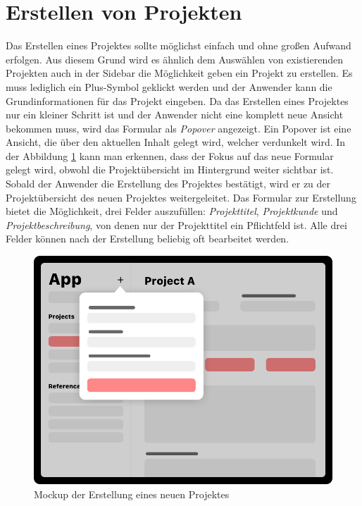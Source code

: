 \section{Erstellen von Projekten}
Das Erstellen eines Projektes sollte möglichst einfach und ohne großen Aufwand erfolgen.
Aus diesem Grund wird es ähnlich dem Auswählen von existierenden Projekten auch in der Sidebar die Möglichkeit geben ein Projekt zu erstellen.
Es muss lediglich ein Plus-Symbol geklickt werden und der Anwender kann die Grundinformationen für das Projekt eingeben.
Da das Erstellen eines Projektes nur ein kleiner Schritt ist und der Anwender nicht eine komplett neue Ansicht bekommen muss, wird das Formular als \emph{Popover} angezeigt.
Ein Popover ist eine Ansicht, die über den aktuellen Inhalt gelegt wird, welcher verdunkelt wird.
In der Abbildung \ref{fig:design-project-create} kann man erkennen, dass der Fokus auf das neue Formular gelegt wird, obwohl die Projektübersicht im Hintergrund weiter sichtbar ist.
Sobald der Anwender die Erstellung des Projektes bestätigt, wird er zu der Projektübersicht des neuen Projektes weitergeleitet.
Das Formular zur Erstellung bietet die Möglichkeit, drei Felder auszufüllen:
\emph{Projekttitel}, \emph{Projektkunde} und \emph{Projektbeschreibung}, von denen nur der Projekttitel ein Pflichtfeld ist.
Alle drei Felder können nach der Erstellung beliebig oft bearbeitet werden.
\newpage
\begin{figure}[h!]
	\centering
	\vspace{15pt}
	\includegraphics[scale=0.4]{images/design-project-create}
	\caption{Mockup der Erstellung eines neuen Projektes}
	\label{fig:design-project-create}
\end{figure}
